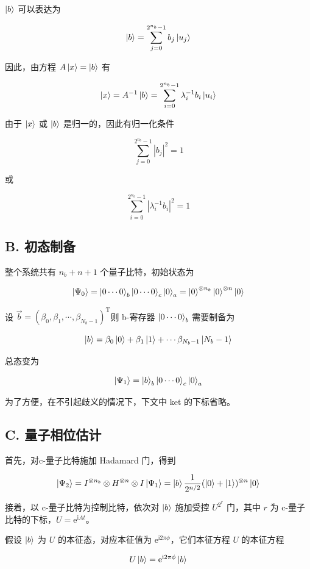 \documentclass[aps,prl,twocolumn,groupedaddress]{revtex4-2}
\begin{document}
$\ket{b}$ 可以表达为

$$
\ket{b} = \sum_{j=0}^{2^{n_b}-1} b_j \ket{u_j}
$$

因此，由方程 $A\ket{x}=\ket{b}$ 有

$$
\ket{x} = A^{-1}\ket{b} = \sum_{i=0}^{2^{n_b}-1} \lambda_i^{-1}b_i \ket{u_i}
$$

由于 $\ket{x}$ 或 $\ket{b}$ 是归一的，因此有归一化条件

$$
\sum_{j=0}^{2^{n_b}-1}\left|b_j \right|^2 = 1
$$

或

$$
\sum_{i=0}^{2^{n_b}-1} \left|\lambda_i^{-1}b_i\right|^2 = 1
$$

\subsection{B. 初态制备}

整个系统共有 $n_b+n+1$ 个量子比特，初始状态为

$$
\ket{\Psi_0}
=\ket{0\cdots 0}_b\ket{0\cdots 0}_c\ket{0}_a
=\ket{0}^{\otimes n_b}\ket{0}^{\otimes n}\ket{0}
$$

设 $\vec{b} = \left(\beta_0,\beta_1,\cdots,\beta_{N_b-1} \right)^{\mathrm{T}} $则 b-寄存器 $\ket{0\cdots 0}_b$ 需要制备为

$$
\ket{b}
=\beta_0\ket{0}+\beta_1\ket{1}+\cdots\beta_{N_b-1}\ket{N_b-1}
$$

总态变为

$$
\ket{\Psi_1}
=\ket{b}_b\ket{0\cdots 0}_c\ket{0}_a
$$

为了方便，在不引起歧义的情况下，下文中 ket 的下标省略。

\subsection{C. 量子相位估计}

首先，对c-量子比特施加 Hadamard 门，得到

$$
\ket{\Psi_2}
=I^{\otimes n_b}\otimes H^{\otimes n}\otimes I\ket{\Psi_1}=
\ket{b}\frac{1 }{2^{n/2} } (\ket{0}+\ket{1})^{\otimes n} \ket{0}
$$

接着，以 c-量子比特为控制比特，依次对 $\ket{b}$ 施加受控 $U^{2^r}$ 门，其中 $r$ 为 c-量子比特的下标，$U=\mathrm{e}^{\mathrm{i}At}$。

假设 $\ket{b}$ 为 $U$ 的本征态，对应本征值为 $\mathrm{e}^{\mathrm{i}2\pi \phi}$，它们本征方程 $U$ 的本征方程

$$
U\ket{b} = \mathrm{e}^{\mathrm{i}2\pi\phi} \ket{b}
$$
\end{document}
